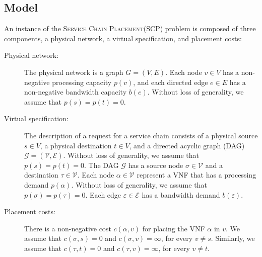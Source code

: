 \documentclass[11pt]{article}
\newcommand{\eps}{\varepsilon}
\newcommand{\scp}{\textsc{SCP}\xspace}
\newcommand{\scplong}{\textsc{Service Chain Placement}\xspace}
\newcommand{\calE}{\mathcal{E}}
\newcommand{\calG}{\mathcal{G}}
\newcommand{\calV}{\mathcal{V}}
\begin{document}
\subsection{Model}
%
An instance of the \scplong (\scp) problem is composed of three
components, a physical network, a virtual specification, and placement
costs:
\begin{description}
\item[Physical network:]
%
  The physical network is a graph $G = (V,E)$.  Each node $v \in V$
  has a non-negative processing capacity $p(v)$, and each directed
  edge $e \in E$ has a non-negative bandwidth capacity $b(e)$.
%
  Without loss of generality, we assume that $p(s) = p(t) = 0$.  

\medskip
  
\item[Virtual specification:]
%
  The description of a request for a service chain consists of a
  physical source $s \in V$, a physical destination $t \in V$, and a
  directed acyclic graph (DAG) $\calG = (\calV,\calE)$.
%
  Without loss of generality, we assume that $p(s) = p(t) = 0$.  
%
  The DAG $\calG$ has a source node $\sigma \in \calV$ and a
  destination $\tau \in \calV$. Each node $\alpha \in \calV$ represent
  a VNF that has a processing demand $p(\alpha)$.
%
  Without loss of generality, we assume that $p(\sigma) = p(\tau) =
  0$.  Each edge $\eps \in \calE$ has a bandwidth demand $b(\eps)$.

\medskip
  
\item[Placement costs:]
%
  There is a non-negative cost $c(\alpha,v)$ for placing the VNF
  $\alpha$ in $v$.  We assume that $c(\sigma,s) = 0$ and $c(\sigma,v)
  = \infty$, for every $v \neq s$.  Similarly, we assume that
  $c(\tau,t) = 0$ and $c(\tau,v) = \infty$, for every $v \neq t$.
\end{description}
\end{document}
